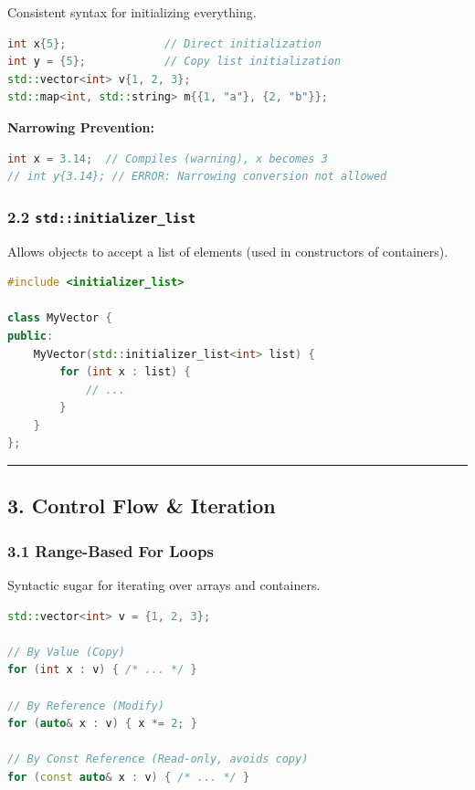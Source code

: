 Consistent syntax for initializing everything.

\begin{lstlisting}[language={C++}]
int x{5};               // Direct initialization
int y = {5};            // Copy list initialization
std::vector<int> v{1, 2, 3};
std::map<int, std::string> m{{1, "a"}, {2, "b"}};
\end{lstlisting}

\textbf{Narrowing Prevention:}

\begin{lstlisting}[language={C++}]
int x = 3.14;  // Compiles (warning), x becomes 3
// int y{3.14}; // ERROR: Narrowing conversion not allowed
\end{lstlisting}

\hypertarget{stdinitializer_list}{%
\subsubsection{\texorpdfstring{2.2
\texttt{std::initializer\_list}}{2.2 std::initializer\_list}}\label{stdinitializer_list}}

Allows objects to accept a list of elements (used in constructors of
containers).

\begin{lstlisting}[language={C++}]
#include <initializer_list>

class MyVector {
public:
    MyVector(std::initializer_list<int> list) {
        for (int x : list) {
            // ...
        }
    }
};
\end{lstlisting}

\begin{center}\rule{0.5\linewidth}{0.5pt}\end{center}

\hypertarget{control-flow-iteration}{%
\subsection{3. Control Flow \& Iteration}\label{control-flow-iteration}}

\hypertarget{range-based-for-loops}{%
\subsubsection{3.1 Range-Based For Loops}\label{range-based-for-loops}}

Syntactic sugar for iterating over arrays and containers.

\begin{lstlisting}[language={C++}]
std::vector<int> v = {1, 2, 3};

// By Value (Copy)
for (int x : v) { /* ... */ }

// By Reference (Modify)
for (auto& x : v) { x *= 2; }

// By Const Reference (Read-only, avoids copy)
for (const auto& x : v) { /* ... */ }
\end{lstlisting}

